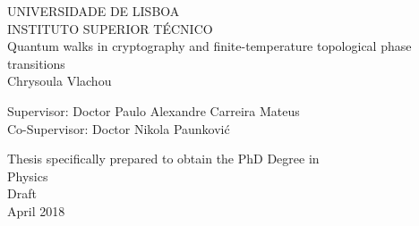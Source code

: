 \begin{center}
\vspace{0.5cm}
{\FontLb UNIVERSIDADE DE LISBOA} \\
\vspace{0.2cm}
{\FontLb INSTITUTO SUPERIOR T\'{E}CNICO} \\


\vspace{5.0cm}
{\FontHb 
Quantum walks in cryptography and finite-temperature topological phase transitions} \\

\vspace{3cm}
{\FontLn Chrysoula Vlachou} \\
\vspace{2cm}

\end{center}
\begin{flushleft}


{\FontMb Supervisor: \FontMn \qquad Doctor Paulo Alexandre Carreira Mateus} \\
{\FontMb Co-Supervisor: \FontMn \hspace{.0em} Doctor Nikola Paunkovi\'c} \\

\vspace{2.5cm}

\end{flushleft}
\begin{center}

{\FontMn Thesis specifically prepared to obtain the PhD Degree in} \\
{\FontMn Physics} \\
\vspace{1cm}
{\FontLn Draft} \\
\vspace{1cm}
{\FontMb April 2018} \\
%
\end{center}

\cleardoublepage

